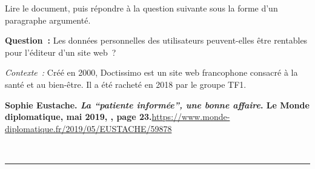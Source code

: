 \documentclass[11pt]{article}
\begin{document}
\noindent Lire le document, puis répondre à la question suivante sous la forme d'un paragraphe argumenté.

\begin{mdframed}[style=citationstyle]
  \textbf{Question :} Les données personnelles des utilisateurs peuvent-elles être rentables pour l'éditeur d'un site web ?
\end{mdframed}

\begin{em}
\noindent \emph{Contexte :} Créé en 2000, Doctissimo est un site web francophone consacré à la santé et au bien-être. Il a été racheté en 2018 par le groupe TF1.
\end{em}

\begin{mdframed}[style=citationstyle]
  \textbf{Sophie Eustache. \emph{La \enquote{patiente informée}, une bonne affaire}. Le Monde diplomatique, mai 2019, , page 23.}\hfill\url{https://www.monde-diplomatique.fr/2019/05/EUSTACHE/59878}

  ~\hrule~



\end{mdframed}
\end{document}
